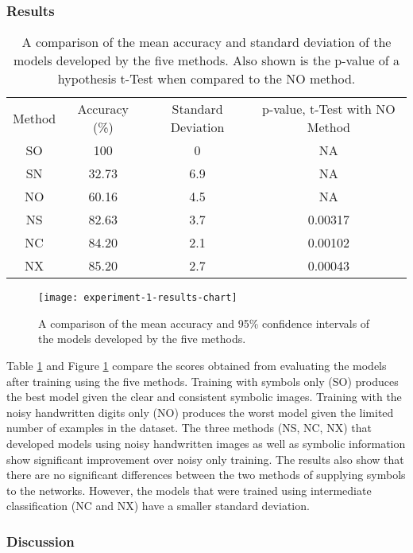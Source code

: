 \subsubsection{Results}

\begin{table}[p!]
	\center
	\caption{A comparison of the mean accuracy and standard deviation of the models developed by the five methods. Also shown is the p-value of a hypothesis t-Test when compared to the NO method.}
	\label{tab:experiment-1-results-table}
	\begin{tabular}{ |c|c|c|c| } 
		\hline
		Method & Accuracy (\%) & Standard Deviation  & p-value, t-Test with NO Method\\ 
		SO & 100 & 0 & NA\\ 
		SN & 32.73 & 6.9 & NA\\
		NO & 60.16 & 4.5 & NA \\ 
		NS & 82.63 & 3.7 & 0.00317\\ 
		NC & 84.20 & 2.1 & 0.00102\\ 
		NX & 85.20 & 2.7 & 0.00043\\ 
		\hline
	\end{tabular}
\end{table}

\begin{figure}[p!]
	\centering
	\texttt{[image: experiment-1-results-chart]}
	\caption{A comparison of the mean accuracy and 95\% confidence intervals of the models developed by the five methods.}
	\label{fig:experiment-1-results-chart}
\end{figure}

Table \ref{tab:experiment-1-results-table} and Figure \ref{fig:experiment-1-results-chart} compare the scores obtained from evaluating the models after training using the five methods. Training with symbols only (SO) produces the best model given the clear and consistent symbolic images. Training with the noisy handwritten digits only (NO) produces the worst model given the limited number of examples in the dataset. The three methods (NS, NC, NX) that developed models using noisy handwritten images as well as symbolic information show significant improvement over noisy only training. The results also show that there are no significant differences between the two methods of supplying symbols to the networks. However, the models that were trained using intermediate classification (NC and NX) have a smaller standard deviation.

\subsubsection{Discussion}

